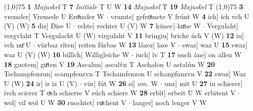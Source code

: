 \documentclass[8pt,a4paper,notitlepage]{article}
\begin{document}
\begin{table}[ht]
\begin{minipage}[t]{0.5\linewidth}
\line(1,0){75} \newline
\textbf{1} \textit{Majuskel} T  \textbf{7} \textit{Initiale} T U W  \textbf{14} \textit{Majuskel} T  \textbf{19} \textit{Majuskel} T  \newline
\line(1,0){75} \newline
\textbf{3} vremder] Vremede U Eroͤmder W  $\cdot$ vrumte] gefroͤmete V frúnt W \textbf{4} ich] ich vch U (V) (W) \textbf{5} diz] Dise U  $\cdot$ rehte] rechter U (V) W \textbf{7} künec] kuͤne W  $\cdot$ Vergulaht] vergvlaht T Vergulacht U (W) virgulaht V \textbf{11} bringiu] briche úch V (W) \textbf{12} iu] vch nuͦ U  $\cdot$ vürbaz rîten] reiten fúrbas W \textbf{13} lâzez] lase V  $\cdot$ swaz] waz U \textbf{15} swaz] waz U (V) (W) \textbf{16} billîch] Willigleiche W  $\cdot$ iuch] îv T \textbf{17} ouch âne] on allen W \textbf{18} guotem] guͦten V \textbf{19} Ascalun] ascalv̂n T Aschalon U astalún W \textbf{20} Tschampfenzun] scampfenzvn T Tschamfenzon U schanpfanzvn V \textbf{22} swaz] Waz U (W) \textbf{24} ir] ir iz U (V)  $\cdot$ vür] fút W \textbf{26} si] \textit{om.} W  $\cdot$ unz] mit U \textbf{27} iu schierer] ivch scierer T oͮch schierre V eúch schiere W \textbf{28} erbît] erbeit U W erbitent V  $\cdot$ wol] vil wol U W \textbf{30} ruochtet] ruͦchent V  $\cdot$ langer] noch lenger V W \newline
\end{minipage}
\end{table}
\end{document}
